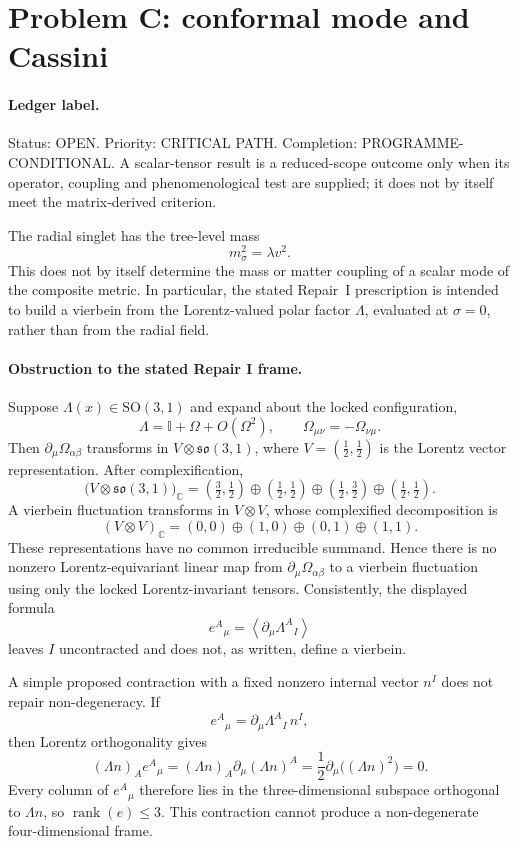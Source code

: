 \section{Problem C: conformal mode and Cassini}
\label{sec:status-C}

\paragraph{Ledger label.}
Status: OPEN. Priority: CRITICAL PATH. Completion:
PROGRAMME-CONDITIONAL. A scalar-tensor result is a reduced-scope
outcome only when its operator, coupling and phenomenological test
are supplied; it does not by itself meet the matrix-derived criterion.

The radial singlet has the tree-level mass
\[
m_\sigma^2=\lambda v^2.
\]
This does not by itself determine the mass or matter coupling of a
scalar mode of the composite metric. In particular, the stated
Repair~I prescription is intended to build a vierbein from the Lorentz-valued
polar factor \(\Lambda\), evaluated at \(\sigma=0\), rather than from
the radial field.

\paragraph{Obstruction to the stated Repair I frame.}
Suppose \(\Lambda(x)\in\mathrm{SO}(3,1)\) and expand about the locked
configuration,
\[
\Lambda=\mathbb I+\Omega+O(\Omega^2),
\qquad
\Omega_{\mu\nu}=-\Omega_{\nu\mu}.
\]
Then \(\partial_\mu\Omega_{\alpha\beta}\) transforms in
\(V\otimes\mathfrak{so}(3,1)\), where \(V=(\tfrac12,\tfrac12)\)
is the Lorentz vector representation. After complexification,
\[
\bigl(V\otimes\mathfrak{so}(3,1)\bigr)_{\mathbb C}
=
\left(\tfrac32,\tfrac12\right)
\oplus\left(\tfrac12,\tfrac12\right)
\oplus\left(\tfrac12,\tfrac32\right)
\oplus\left(\tfrac12,\tfrac12\right).
\]
A vierbein fluctuation transforms in \(V\otimes V\), whose
complexified decomposition is
\[
(V\otimes V)_{\mathbb C}
=
(0,0)\oplus(1,0)\oplus(0,1)\oplus(1,1).
\]
These representations have no common irreducible summand. Hence
there is no nonzero Lorentz-equivariant linear map from
\(\partial_\mu\Omega_{\alpha\beta}\) to a vierbein fluctuation using
only the locked Lorentz-invariant tensors. Consistently, the displayed
formula
\[
e^A{}_\mu=\left\langle\partial_\mu\Lambda^A{}_I\right\rangle
\]
leaves \(I\) uncontracted and does not, as written, define a vierbein.

A simple proposed contraction with a fixed nonzero internal vector
\(n^I\) does not repair non-degeneracy. If
\[
e^A{}_\mu=\partial_\mu\Lambda^A{}_I\,n^I,
\]
then Lorentz orthogonality gives
\[
(\Lambda n)_A e^A{}_\mu
=
(\Lambda n)_A\partial_\mu(\Lambda n)^A
=
\frac12\partial_\mu\bigl((\Lambda n)^2\bigr)
=0.
\]
Every column of \(e^A{}_\mu\) therefore lies in the
three-dimensional subspace orthogonal to \(\Lambda n\), so
\(\operatorname{rank}(e)\leq 3\). This contraction cannot produce a
non-degenerate four-dimensional frame.

